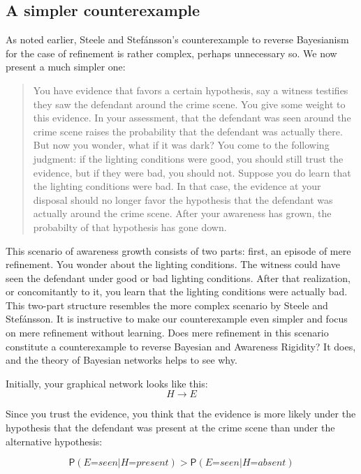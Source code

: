 \documentclass[
  11pt,
  dvipsnames,enabledeprecatedfontcommands]{scrartcl}
\newcommand{\pr}[1]{\ensuremath{\mathsf{P}(#1)}}
\begin{document}
\hypertarget{a-simpler-counterexample}{%
\subsection{A simpler counterexample}\label{a-simpler-counterexample}}

As noted earlier, Steele and Stefánsson's counterexample to reverse
Bayesianism for the case of refinement is rather complex, perhaps
unnecessary so. We now present a much simpler one:

\begin{quote}
You have evidence that favors a certain hypothesis, say a witness
testifies they saw the defendant around the crime scene. You give some
weight to this evidence. In your assessment, that the defendant was seen
around the crime scene raises the probability that the defendant was
actually there. But now you wonder, what if it was dark? You come to the
following judgment: if the lighting conditions were good, you should
still trust the evidence, but if they were bad, you should not. Suppose
you do learn that the lighting conditions were bad. In that case, the
evidence at your disposal should no longer favor the hypothesis that the
defendant was actually around the crime scene. After your awareness has
grown, the probabilty of that hypothesis has gone down.
\end{quote}

\noindent This scenario of awareness growth consists of two parts:
first, an episode of mere refinement. You wonder about the lighting
conditions. The witness could have seen the defendant under good or bad
lighting conditions. After that realization, or concomitantly to it, you
learn that the lighting conditions were actually bad. This two-part
structure resembles the more complex scenario by Steele and Stefánsson.
It is instructive to make our counterexample even simpler and focus on
mere refinement without learning. Does mere refinement in this scenario
constitute a counterexample to reverse Bayesian and Awareness Rigidity?
It does, and the theory of Bayesian networks helps to see why.

Initially, your graphical network looks like this: \[H \rightarrow E\]

\noindent Since you trust the evidence, you think that the evidence is
more likely under the hypothesis that the defendant was present at the
crime scene than under the alternative hypothesis:

\[\pr{\textit{E=seen} \vert \textit{H=present}} > \pr{\textit{E=seen} \vert \textit{H=absent}}\]
\end{document}
